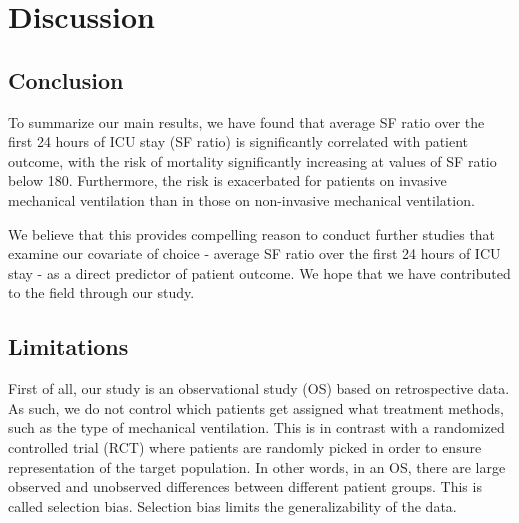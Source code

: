 
\chapter{Discussion} %

\label{Chapter6} %



\section{Conclusion} %



To summarize our main results, we have found that average SF ratio over the first 24 hours of ICU stay (SF ratio) is significantly correlated with patient outcome, with the risk of  mortality significantly increasing at values of SF ratio below 180. Furthermore, the risk is exacerbated for patients on invasive mechanical ventilation than in those on non-invasive mechanical ventilation. 

We believe that this provides compelling reason to conduct further studies that examine our covariate of choice - average SF ratio over the first 24 hours of ICU stay - as a direct predictor of patient outcome. We hope that we have contributed to the field through our study. 


\section{Limitations}


First of all, our study is an observational study (OS) based on retrospective data. As such, we do not control which patients get assigned what treatment methods, such as the type of mechanical ventilation. This is in contrast with a randomized controlled trial (RCT) where patients are randomly picked in order to ensure representation of the target population. In other words, in an OS, there are large observed and unobserved differences between different patient groups. This is called selection bias. Selection bias limits the generalizability of the data. 

